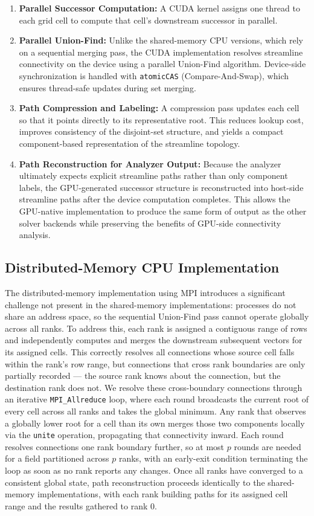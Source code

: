 \begin{enumerate}
	\item \textbf{Parallel Successor Computation:} A CUDA kernel assigns one thread to each grid cell to compute that cell's downstream successor in parallel.
	\item \textbf{Parallel Union-Find:} Unlike the shared-memory CPU versions, which rely on a sequential merging pass, the CUDA implementation resolves streamline connectivity on the device using a parallel Union-Find algorithm. Device-side synchronization is handled with \texttt{atomicCAS} (Compare-And-Swap), which ensures thread-safe updates during set merging.
	\item \textbf{Path Compression and Labeling:} A compression pass updates each cell so that it points directly to its representative root. This reduces lookup cost, improves consistency of the disjoint-set structure, and yields a compact component-based representation of the streamline topology.
	\item \textbf{Path Reconstruction for Analyzer Output:} Because the analyzer ultimately expects explicit streamline paths rather than only component labels, the GPU-generated successor structure is reconstructed into host-side streamline paths after the device computation completes. This allows the GPU-native implementation to produce the same form of output as the other solver backends while preserving the benefits of GPU-side connectivity analysis.
\end{enumerate}


\subsection{Distributed-Memory CPU Implementation}

The distributed-memory implementation using MPI introduces a significant challenge not present in the shared-memory implementations: processes do not share an address space, so the sequential Union-Find pass cannot operate globally across all ranks.
To address this, each rank is assigned a contiguous range of rows and independently computes and merges the downstream subsequent vectors for its assigned cells.
This correctly resolves all connections whose source cell falls within the rank's row range, but connections that cross rank boundaries are only partially recorded --- the source rank knows about the connection, but the destination rank does not.
We resolve these cross-boundary connections through an iterative \texttt{MPI\_Allreduce} loop, where each round broadcasts the current root of every cell across all ranks and takes the global minimum.
Any rank that observes a globally lower root for a cell than its own merges those two components locally via the \texttt{unite} operation, propagating that connectivity inward.
Each round resolves connections one rank boundary further, so at most $p$ rounds are needed for a field partitioned across $p$ ranks, with an early-exit condition terminating the loop as soon as no rank reports any changes.
Once all ranks have converged to a consistent global state, path reconstruction proceeds identically to the shared-memory implementations, with each rank building paths for its assigned cell range and the results gathered to rank 0.

